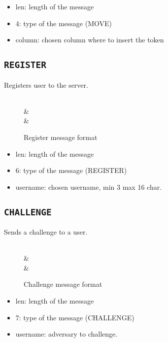 \begin{itemize}
	\item len: length of the message
	\item 4: type of the message (MOVE)
	\item column: chosen column where to insert the token
\end{itemize}


\subsection{\texttt{REGISTER}}
Registers user to the server.
\begin{figure}[h]
	\centering
	\begin{bytefield}[bitwidth=1.1em]{32}
		 \\
		&  \\
		& 
	\end{bytefield}
	\caption{Register message format}
\end{figure}

\begin{itemize}
	\item len: length of the message
	\item 6: type of the message (REGISTER)
	\item username: chosen username, min 3 max 16 char.
\end{itemize}

\subsection{\texttt{CHALLENGE}}
Sends a challenge to a user.
\begin{figure}[h]
	\centering
	\begin{bytefield}[bitwidth=1.1em]{16}
		 \\
		&  \\
		& 
	\end{bytefield}
	\caption{Challenge message format}
\end{figure}

\begin{itemize}
	\item len: length of the message
	\item 7: type of the message (CHALLENGE)
	\item username: adversary to challenge.
\end{itemize}

